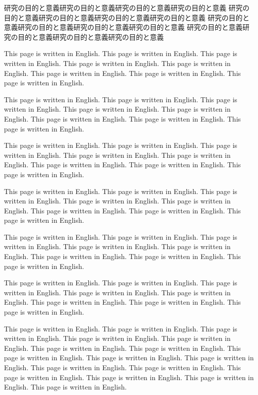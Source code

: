 \documentclass[12pt]{jarticle} %
\begin{document}
研究の目的と意義研究の目的と意義研究の目的と意義研究の目的と意義 
研究の目的と意義研究の目的と意義研究の目的と意義研究の目的と意義 
研究の目的と意義研究の目的と意義研究の目的と意義研究の目的と意義 
研究の目的と意義研究の目的と意義研究の目的と意義研究の目的と意義 


\newpage

This page is written in English. This page is written in English. 
This page is written in English. This page is written in English. 
This page is written in English. This page is written in English. 
This page is written in English. This page is written in English. 

This page is written in English. This page is written in English. 
This page is written in English. This page is written in English. 
This page is written in English. This page is written in English. 
This page is written in English. This page is written in English. 

This page is written in English. This page is written in English. 
This page is written in English. This page is written in English. 
This page is written in English. This page is written in English. 
This page is written in English. This page is written in English. 

This page is written in English. This page is written in English. 
This page is written in English. This page is written in English. 
This page is written in English. This page is written in English. 
This page is written in English. This page is written in English. 

This page is written in English. This page is written in English. 
This page is written in English. This page is written in English. 
This page is written in English. This page is written in English. 
This page is written in English. This page is written in English. 

This page is written in English. This page is written in English. 
This page is written in English. This page is written in English. 
This page is written in English. This page is written in English. 
This page is written in English. This page is written in English. 

This page is written in English. This page is written in English. 
This page is written in English. This page is written in English. 
This page is written in English. This page is written in English. 
This page is written in English. This page is written in English. 
This page is written in English. This page is written in English. 
This page is written in English. This page is written in English. 
This page is written in English. This page is written in English. 
This page is written in English. This page is written in English. 
\end{document}

